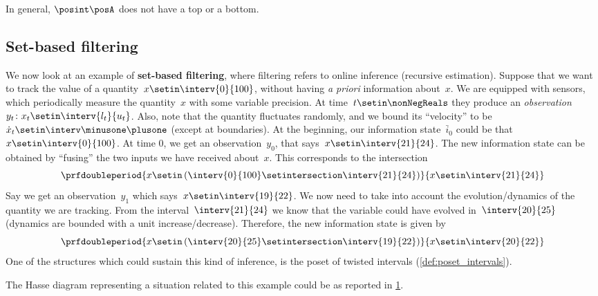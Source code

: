 In general, $\posint\posA$ does not have a top or a bottom.

\vfill
\clearpage

\subsection{Set-based filtering}
We now look at an example of \textbf{set-based filtering}, where filtering refers to online inference (recursive estimation).
Suppose that we want to track the value of a quantity~$x\setin \interv{0}{100}$, without having \emph{a priori} information about~$x$.
We are equipped with sensors, which periodically measure the quantity~$x$ with some variable precision.
At time~$t\setin \nonNegReals$ they produce an \emph{observation}~$y_t\colon x_t\setin \interv{l_t}{u_t}$.
Also, note that the quantity fluctuates randomly, and we bound its ``velocity'' to be~$\dot{x}_t\setin \interv\minusone\plusone$ (except at boundaries).
At the beginning, our information state~$\bar{i}_0$ could be that~$x\setin \interv{0}{100}$.
At time 0, we get an observation~$y_0$, that says~$x\setin \interv{21}{24}$.
The new information state can be obtained by ``fusing'' the two inputs we have received about~$x$.
This corresponds to the intersection
\begin{equation}\label{eq:filtering-2}
    \prfdoubleperiod{
        x\setin \left( \interv{0}{100} \setintersection \interv{21}{24}\right)
    }{
        x\setin \interv{21}{24}
    }
\end{equation}
Say we get an observation~$y_1$ which says~$x\setin \interv{19}{22}$.
We now need to take into account the evolution/dynamics of the quantity we are tracking.
From the interval~$\interv{21}{24}$ we know that the variable could have evolved in~$\interv{20}{25}$ (dynamics are bounded with a unit increase/decrease).
Therefore, the new information state is given by
\begin{equation}\label{eq:filtering-3}
    \prfdoubleperiod{
        x\setin \left( \interv{20}{25} \setintersection \interv{19}{22}\right)
    }{
        x\setin \interv{20}{22}
    }
\end{equation}
One of the structures which could sustain this kind of inference, is the poset of twisted intervals  (\cref{def:poset_intervals}).

The Hasse diagram representing a situation related to this example could be as reported in \cref{fig:hasse_filtering}.
\begin{figure}[h!]
    \centering
    \caption{}
    \label{fig:hasse_filtering}
\end{figure}
